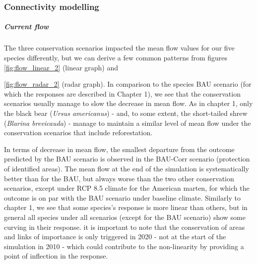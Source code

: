 \subsubsection{Connectivity modelling}

\vspace{1em}

\subparagraph*{\textit{Current flow}} The three conservation scenarios impacted the mean flow values for our five species differently, but we can derive a few common patterns from figures \ref{fig:flow_linear_2} (linear graph) and {\ref{fig:flow_radar_2} (radar graph). In comparison to the species BAU scenario (for which the responses are described in Chapter 1), we see that the conservation scenarios usually manage to slow the decrease in mean flow. As in chapter 1, only the black bear (\textit{Ursus americanus}) - and, to some extent, the short-tailed shrew (\textit{Blarina brevicauda}) - manage to maintain a similar level of mean flow under the conservation scenarios that include reforestation.

In terms of decrease in mean flow, the smallest departure from the outcome predicted by the BAU scenario is observed in the BAU-Corr scenario (protection of identified areas). The mean flow at the end of the simulation is systematically better than for the BAU, but always worse than the two other conservation scenarios, except under RCP 8.5 climate for the American marten, for which the outcome is on par with the BAU scenario under baseline climate.  Similarly to chapter 1, we see that some species's response is more linear than others, but in general all species under all scenarios (except for the BAU scenario) show some curving in their response. it is important to note that the conservation of areas and links of importance is only triggered in 2020  - not at the start of the simulation in 2010 - which could contribute to the non-linearity by providing a point of inflection in the response.

}
